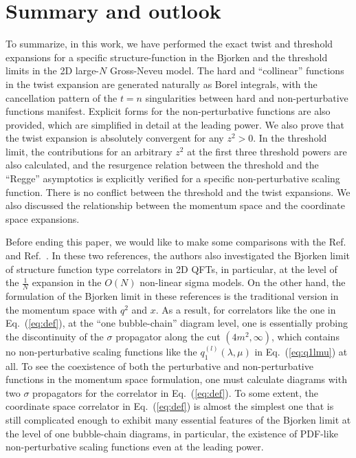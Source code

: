 \documentclass[a4paper,11pt]{article}
\begin{document}
\section{Summary and outlook}
To summarize, in this work, we have performed the exact twist and threshold expansions for a specific structure-function in the Bjorken and the threshold limits in the 2D large-$N$ Gross-Neveu model. The hard and ``collinear'' functions in the twist expansion are generated naturally as Borel integrals, with the cancellation pattern of the $t=n$ singularities between hard and non-perturbative functions manifest. Explicit forms for the non-perturbative functions are also provided,  which are simplified in detail at the leading power. We also prove that the twist expansion is absolutely convergent for any $z^2>0$. In the threshold limit, the contributions for an arbitrary $z^2$ at the first three threshold powers are also calculated, and the resurgence relation between the threshold and the ``Regge'' asymptotics is explicitly verified for a specific non-perturbative scaling function. There is no conflict between the threshold and the twist expansions. We also discussed the relationship between the momentum space and the coordinate space expansions. 




Before ending this paper, we would like to make some comparisons with the Ref.~\cite{Balog:2004mj} and Ref.~\cite{Balog:2004yg}. In these two references, the authors also investigated the Bjorken limit of structure function type correlators in 2D QFTs, in particular, at the level of the $\frac{1}{N}$ expansion in the $O(N)$ non-linear sigma models. On the other hand, the formulation of the Bjorken limit in these references is the traditional version in the momentum space with $q^2$ and $x$. As a result, for correlators like the one in Eq.~(\ref{eq:def}), at the ``one bubble-chain'' diagram level, one is essentially probing the discontinuity of the $\sigma$ propagator along the cut $(4m^2,\infty)$, which contains no non-perturbative scaling functions like the $q_1^{(l)}(\lambda,\mu)$ in Eq.~(\ref{eq:q1lmu}) at all. To see the coexistence of both the perturbative and non-perturbative functions in the momentum space formulation, one must calculate diagrams with two $\sigma$ propagators for the correlator in Eq.~(\ref{eq:def}). To some extent, the coordinate space correlator in Eq.~(\ref{eq:def}) is almost the simplest one that is still complicated enough to exhibit many essential features of the Bjorken limit at the level of one bubble-chain diagrams, in particular, the existence of PDF-like non-perturbative scaling functions even at the leading power. 
\end{document}
